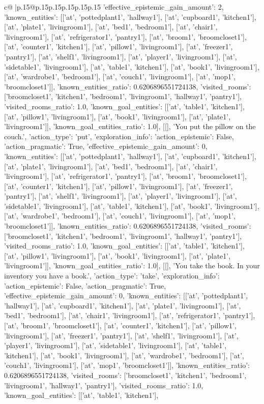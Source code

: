 \documentclass{article}
\begin{document}
{\begin{supertabular}{c@{$\;$}|p{.15\linewidth}@{}p{.15\linewidth}p{.15\linewidth}p{.15\linewidth}p{.15\linewidth}p{.15\linewidth}}
{{{'effective_epistemic_gain_amount': 2, 'known_entities': [['at', 'pottedplant1', 'hallway1'], ['at', 'cupboard1', 'kitchen1'], ['at', 'plate1', 'livingroom1'], ['at', 'bed1', 'bedroom1'], ['at', 'chair1', 'livingroom1'], ['at', 'refrigerator1', 'pantry1'], ['at', 'broom1', 'broomcloset1'], ['at', 'counter1', 'kitchen1'], ['at', 'pillow1', 'livingroom1'], ['at', 'freezer1', 'pantry1'], ['at', 'shelf1', 'livingroom1'], ['at', 'player1', 'livingroom1'], ['at', 'sidetable1', 'livingroom1'], ['at', 'table1', 'kitchen1'], ['at', 'book1', 'livingroom1'], ['at', 'wardrobe1', 'bedroom1'], ['at', 'couch1', 'livingroom1'], ['at', 'mop1', 'broomcloset1']], 'known_entities_ratio': 0.6206896551724138, 'visited_rooms': ['broomcloset1', 'kitchen1', 'bedroom1', 'livingroom1', 'hallway1', 'pantry1'], 'visited_rooms_ratio': 1.0, 'known_goal_entities': [['at', 'table1', 'kitchen1'], ['at', 'pillow1', 'livingroom1'], ['at', 'book1', 'livingroom1'], ['at', 'plate1', 'livingroom1']], 'known_goal_entities_ratio': 1.0}}], [[], 'You put the pillow on the couch.', {'action_type': 'put', 'exploration_info': {'action_epistemic': False, 'action_pragmatic': True, 'effective_epistemic_gain_amount': 0, 'known_entities': [['at', 'pottedplant1', 'hallway1'], ['at', 'cupboard1', 'kitchen1'], ['at', 'plate1', 'livingroom1'], ['at', 'bed1', 'bedroom1'], ['at', 'chair1', 'livingroom1'], ['at', 'refrigerator1', 'pantry1'], ['at', 'broom1', 'broomcloset1'], ['at', 'counter1', 'kitchen1'], ['at', 'pillow1', 'livingroom1'], ['at', 'freezer1', 'pantry1'], ['at', 'shelf1', 'livingroom1'], ['at', 'player1', 'livingroom1'], ['at', 'sidetable1', 'livingroom1'], ['at', 'table1', 'kitchen1'], ['at', 'book1', 'livingroom1'], ['at', 'wardrobe1', 'bedroom1'], ['at', 'couch1', 'livingroom1'], ['at', 'mop1', 'broomcloset1']], 'known_entities_ratio': 0.6206896551724138, 'visited_rooms': ['broomcloset1', 'kitchen1', 'bedroom1', 'livingroom1', 'hallway1', 'pantry1'], 'visited_rooms_ratio': 1.0, 'known_goal_entities': [['at', 'table1', 'kitchen1'], ['at', 'pillow1', 'livingroom1'], ['at', 'book1', 'livingroom1'], ['at', 'plate1', 'livingroom1']], 'known_goal_entities_ratio': 1.0}}], [[], 'You take the book. In your inventory you have a book.', {'action_type': 'take', 'exploration_info': {'action_epistemic': False, 'action_pragmatic': True, 'effective_epistemic_gain_amount': 0, 'known_entities': [['at', 'pottedplant1', 'hallway1'], ['at', 'cupboard1', 'kitchen1'], ['at', 'plate1', 'livingroom1'], ['at', 'bed1', 'bedroom1'], ['at', 'chair1', 'livingroom1'], ['at', 'refrigerator1', 'pantry1'], ['at', 'broom1', 'broomcloset1'], ['at', 'counter1', 'kitchen1'], ['at', 'pillow1', 'livingroom1'], ['at', 'freezer1', 'pantry1'], ['at', 'shelf1', 'livingroom1'], ['at', 'player1', 'livingroom1'], ['at', 'sidetable1', 'livingroom1'], ['at', 'table1', 'kitchen1'], ['at', 'book1', 'livingroom1'], ['at', 'wardrobe1', 'bedroom1'], ['at', 'couch1', 'livingroom1'], ['at', 'mop1', 'broomcloset1']], 'known_entities_ratio': 0.6206896551724138, 'visited_rooms': ['broomcloset1', 'kitchen1', 'bedroom1', 'livingroom1', 'hallway1', 'pantry1'], 'visited_rooms_ratio': 1.0, 'known_goal_entities': [['at', 'table1', 'kitchen1'], }}}
\end{supertabular}}
\end{document}
